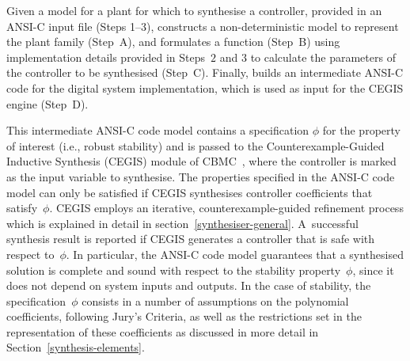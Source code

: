 \documentclass{sig-alternate-05-2015}
\begin{document}
Given a model for a plant for which to synthesise a controller, provided in
an ANSI-C input file (Steps 1--3), \tool constructs a non-deterministic
model to represent the plant family (Step~A), and formulates a function
(Step~B) using implementation details provided in Steps~$2$ and $3$ to
calculate the parameters of the controller to be synthesised (Step~C). 
Finally, \tool builds an intermediate ANSI-C code for the digital system
implementation, which is used as input for the CEGIS engine (Step~D).

This intermediate ANSI-C code model contains a specification $\phi$ for the
property of interest (i.e., robust stability) and is passed to the
Counterexample-Guided Inductive Synthesis (CEGIS) module of
CBMC~\cite{ClarkeKL04}, where the controller is marked as the input variable
to synthesise.  The properties specified in the ANSI-C code model can only
be satisfied if CEGIS synthesises controller coefficients that
satisfy~$\phi$.  CEGIS employs an iterative, counterexample-guided
refinement process which is explained in detail in
section~\ref{synthesiser-general}.  A~successful synthesis result is
reported if CEGIS generates a controller that is safe with respect to~$\phi$. 
In particular, the ANSI-C code model guarantees that a synthesised solution
is complete and sound with respect to the stability property~$\phi$, since it
does not depend on system inputs and outputs.  In the case of stability, the
specification~$\phi$ consists in a number of assumptions on the polynomial
coefficients, following Jury's Criteria, as well as the restrictions set in
the representation of these coefficients as discussed in more detail in 
Section~\ref{synthesis-elements}.

\end{document}
